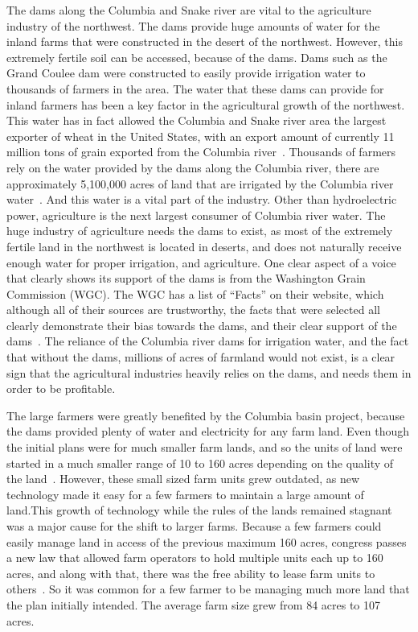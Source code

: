 \documentclass[12pt,twoside]{article}
\begin{document}
The dams along the Columbia and Snake river are vital to the agriculture
industry of the northwest. The dams provide huge amounts of water for the
inland farms that were constructed in the desert of the northwest. However,
this extremely fertile soil can be accessed, because of the dams. Dams such as
the Grand Coulee dam were constructed to easily provide irrigation water to
thousands of farmers in the area. The water that these dams can provide for
inland farmers has been a key factor in the agricultural growth of the
northwest. This water has in fact allowed the Columbia and Snake river area the
largest exporter of wheat in the United States, with an export amount of
currently 11 million tons of grain exported from the Columbia
river~\cite{USDA_GRAIN}. Thousands of farmers rely on the water provided by the
dams along the Columbia river, there are approximately 5,100,000 acres of land
that are irrigated by the Columbia river water~\cite{NWC_IRR}. And this water
is a vital part of the industry. Other than hydroelectric power, agriculture is
the next largest consumer of Columbia river water. The huge industry of
agriculture needs the dams to exist, as most of the extremely fertile land in
the northwest is located in deserts, and does not naturally receive enough
water for proper irrigation, and agriculture. One clear aspect of a voice that
clearly shows its support of the dams is from the Washington Grain Commission
(WGC). The WGC has a list of ``Facts'' on their website, which although all of
their sources are trustworthy, the facts that were selected all clearly
demonstrate their bias towards the dams, and their clear support of the
dams~\cite{WGC}. The reliance of the Columbia river dams for irrigation water,
and the fact that without the dams, millions of acres of farmland would not
exist, is a clear sign that the agricultural industries heavily relies on the
dams, and needs them in order to be profitable.

The large farmers were greatly benefited by the Columbia basin project, because
the dams provided plenty of water and electricity for any farm land. Even
though the initial plans were for much smaller farm lands, and so the units of
land were started in a much smaller range of 10 to 160 acres depending on the
quality of the land~\cite{PCP}. However, these small sized farm units grew
outdated, as new technology made it easy for a few farmers to maintain a large
amount of land.This growth of technology while the rules of the lands remained
stagnant was a major cause for the shift to larger farms. Because a few farmers
could easily manage land in access of the previous maximum 160 acres, congress
passes a new law that allowed farm operators to hold multiple units each up to
160 acres, and along with that, there was the free ability to lease farm units
to others~\cite{PCP}. So it was common for a few farmer to be managing much
more land that the plan initially intended. The average farm size grew from 84
acres to 107 acres.
\end{document}
